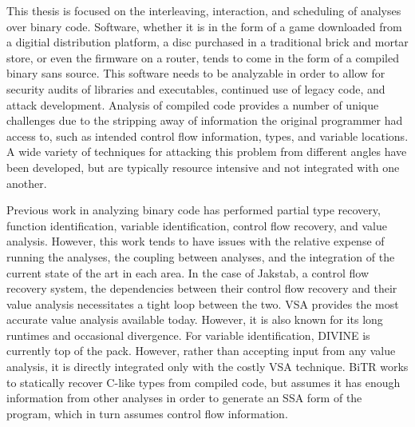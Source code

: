 \newcommand{\sysname}{Holmes}
This thesis is focused on the interleaving, interaction, and scheduling of analyses over binary code.
Software, whether it is in the form of a game downloaded from a digitial distribution platform, a disc purchased in a traditional brick and mortar store, or even the firmware on a router, tends to come in the form of a compiled binary sans source.
This software needs to be analyzable in order to allow for security audits of libraries and executables, continued use of legacy code, and attack development.
Analysis of compiled code provides a number of unique challenges due to the stripping away of information the original programmer had access to, such as intended control flow information, types, and variable locations.
A wide variety of techniques for attacking this problem from different angles have been developed, but are typically resource intensive and not integrated with one another.

Previous work in analyzing binary code has performed partial type recovery, function identification, variable identification, control flow recovery, and value analysis.
However, this work tends to have issues with the relative expense of running the analyses, the coupling between analyses, and the integration of the current state of the art in each area.
In the case of Jakstab, a control flow recovery system, the dependencies between their control flow recovery and their value analysis necessitates a tight loop between the two.
VSA provides the most accurate value analysis available today. However, it is also known for its long runtimes and occasional divergence.
For variable identification, DIVINE is currently top of the pack. However, rather than accepting input from any value analysis, it is directly integrated only with the costly VSA technique.
BiTR works to statically recover C-like types from compiled code, but assumes it has enough information from other analyses in order to generate an SSA form of the program, which in turn assumes control flow information.

